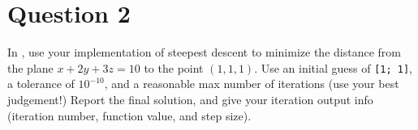 \section{Question 2}

\begin{question}
    In \MATLAB, use your implementation of steepest descent to minimize the distance from the plane $x+2y+3z=10$ to the point $(1,1,1)$. Use an initial guess of \verb+[1; 1]+, a tolerance of $10^{-10}$, and a reasonable max number of iterations (use your best judgement!) Report the final solution, and give your iteration output info (iteration number, function value, and step size).
\end{question}

\begin{answer}
    
\end{answer}